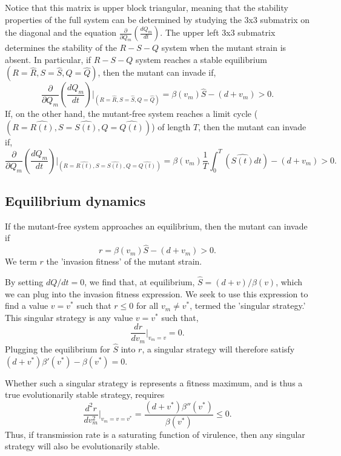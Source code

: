 \documentclass[12pt,reqno,final,pdftex]{amsart}\usepackage[]{graphicx}\usepackage[]{color}
\theoremstyle{plain}
\numberwithin{equation}{part}
\begin{document}
Notice that this matrix is upper block triangular, meaning that the stability properties of the full system can be determined by studying the 3x3 submatrix on the diagonal and the equation $\frac{\partial}{\partial Q_m}\left(\frac{dQ_m}{dt}\right)$.
The upper left 3x3 submatrix determines the stability of the $R-S-Q$ system when the mutant strain is absent.
In particular, if $R-S-Q$ system reaches a stable equilibrium $(R=\hat{R},S=\hat{S},Q=\hat{Q})$, then the mutant can invade if,
\begin{equation}
\frac{\partial}{\partial Q_m}\left(\frac{dQ_m}{dt}\right)|_{(R=\hat{R},S=\hat{S},Q=\hat{Q})} = \beta(v_m) \hat{S} - (d+v_m) > 0.
\end{equation}
If, on the other hand, the mutant-free system reaches a limit cycle ($(R=\hat{R(t)},S=\hat{S(t)},Q=\hat{Q(t)})$) of length $T$, then the mutant can invade if,
\begin{equation}
\frac{\partial}{\partial Q_m}\left(\frac{dQ_m}{dt}\right)|_{(R=\hat{R(t)},S=\hat{S(t)},Q=\hat{Q(t)})} = \beta(v_m) \frac{1}{T} \int_{0}^T \left(\hat{S(t)} dt\right) - (d+v_m) > 0.
\end{equation}

\subsection*{Equilibrium dynamics}
If the mutant-free system approaches an equilibrium, then the mutant can invade if
\begin{equation}
r = \beta(v_m) \hat{S} - (d+v_m) > 0.
\end{equation}
We term $r$ the 'invasion fitness' of the mutant strain.

By setting $dQ/dt = 0$, we find that, at equilibrium, $\hat{S} = (d+v)/\beta(v)$, which we can plug into the invasion fitness expression.
We seek to use this expression to find a value $v = v^*$ such that $r \leq 0$ for all $v_m \neq v^*$, termed the 'singular strategy.'
This singular strategy is any value $v = v^*$ such that,
\begin{equation}
\frac{dr}{dv_m}|_{v_m=v} = 0.
\end{equation}
Plugging the equilibrium for $\hat{S}$ into $r$, a singular strategy will therefore satisfy $(d+v^*)\beta'(v^*)-\beta(v^*)=0$.

Whether such a singular strategy is represents a fitness maximum, and is thus a true evolutionarily stable strategy, requires
\begin{equation}
\frac{d^2r}{dv_m^2}|_{v_m=v=v^*} = \frac{(d+v^*) \beta''(v^*)}{\beta(v^*)} \leq 0.
\end{equation}
Thus, if transmission rate is a saturating function of virulence, then any singular strategy will also be evolutionarily stable.
\end{document}
